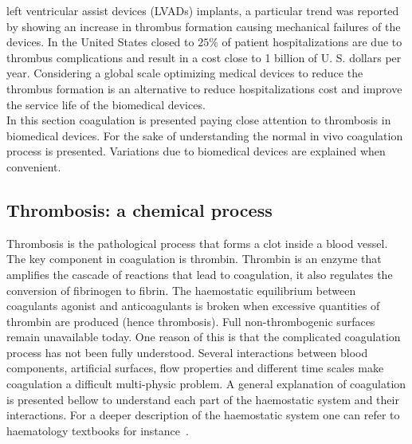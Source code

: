 \documentclass[%
 nofootinbib,
 amsmath,amssymb,
 aps,
 pra,
]{revtex4-1}
\begin{document}
left ventricular assist devices (LVADs) implants, a particular trend was reported by \citet{Mehra:2014} showing an increase in thrombus formation causing mechanical failures of the devices. In the United States closed to $25 \%$ of patient hospitalizations are due to thrombus complications and result in a cost close to 1 billion of U. S. dollars per year. Considering a global scale optimizing medical devices to reduce the thrombus formation is an alternative to reduce hospitalizations cost and improve the service life of the biomedical devices. \\ 
In this section coagulation is presented paying close attention to thrombosis in biomedical devices. For the sake of understanding the normal in vivo coagulation process is presented. Variations due to biomedical devices are explained when convenient. 
\subsection{ \label{sec:chemical} Thrombosis: a chemical process}
Thrombosis is the pathological process that forms a clot inside a blood vessel. The key component in coagulation is thrombin. Thrombin is an enzyme that amplifies the cascade of reactions that lead to coagulation, it also regulates the conversion of fibrinogen to fibrin. The haemostatic equilibrium between coagulants agonist and anticoagulants is broken when excessive quantities of thrombin are produced (hence thrombosis). Full non-thrombogenic  surfaces remain unavailable today. One reason of this is that the complicated coagulation process has not been fully understood. Several interactions between blood components, artificial surfaces, flow properties and different time scales make coagulation a difficult multi-physic problem. A general explanation of coagulation is presented bellow to understand each part of the haemostatic system and their interactions. For a deeper description of the haemostatic system one can refer to haematology textbooks for instance~\cite{Hoffbrand:2011}.\\
\end{document}
